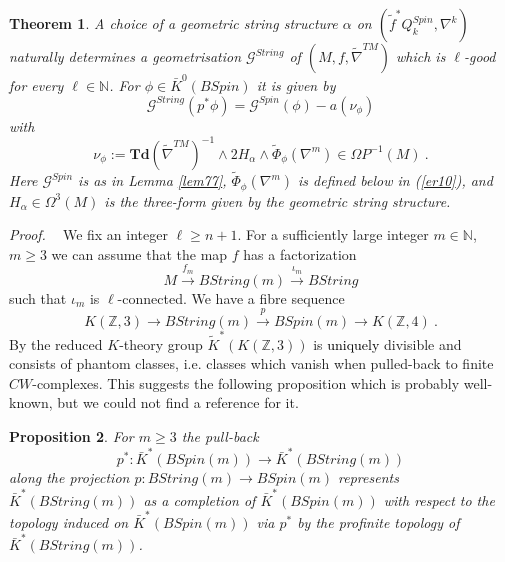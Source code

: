 \documentclass[12pt]{article}
\newtheorem{theorem}{Theorem}[section]
\newtheorem{prop}[theorem]{Proposition}
\newcommand{\cG}{{\mathcal{G}}}
\newcommand{\proof}{{\it Proof.$\:\:\:\:$}}
\newcommand{\nat}{{\mathbb{N}}}
\newcommand{\Z}{{\mathbb{Z}}}
\newcommand{\Td}{{\mathbf{Td}}}
\begin{document}
\begin{theorem}\label{prop77}
A choice of a geometric string structure
 $\alpha$ on $(\tilde f^{*}Q^{Spin}_{k},\nabla^{k})$ naturally determines 
a geometrisation   $\cG^{String}$ of $(M,f,\tilde \nabla^{TM})$ which is $\ell$-good for every $\ell\in \nat$.
For $\phi\in \bar K^{0}(BSpin)$ it is given by
$$\cG^{String}(p^{*}\phi)=\cG^{Spin}(\phi)-a(\nu_{\phi})$$
with
$$\nu_{\phi}:=
\Td(\tilde \nabla^{TM})^{-1}\wedge 2H_{\alpha}\wedge \tilde \Phi_{\phi}(\nabla^{m})\in \Omega P^{-1}(M)\ .$$ Here 
$\cG^{Spin}$ is as in Lemma \ref{lem77}, 
 $\tilde \Phi_{\phi}(\nabla^{m})$ is defined below in (\ref{er10}),
and $H_{\alpha}\in \Omega^{3}(M)$ is the three-form given by the geometric string structure. 
 \end{theorem}
 \proof
\color{black} 
We fix an integer $\ell\ge n+1$.
For a sufficiently large   integer $m\in \nat$, $m\ge 3$ we can assume that
 the map $f$ has a factorization $$M\stackrel{f_{m}}{\to} BString(m) \stackrel{\iota_{m}}{\to} BString$$
 such that $\iota_{m}$ is $\ell$-connected.
 We have a fibre sequence
$$K(\Z,3)\to BString(m)\stackrel{p}{\to} BSpin(m)\to K(\Z,4)\ .$$
By \cite{MR0231369} the reduced $K$-theory group
$\tilde K^{*}(K(\Z,3))$   is \textcolor{black}{uniquely} divisible and consists of phantom classes, i.e. classes which vanish when pulled-back to finite $CW$-complexes. This suggests the following proposition which is probably well-known, but we could not find a reference for it.




 
 \begin{prop}\label{pinv}
 For $m\ge 3$
the pull-back  \begin{equation}\label{barp}p^{*}:\bar K^{*}(BSpin(m)) \to   \bar K^{*}(BString(m)) \end{equation} along the projection 
$p:BString(m)\to BSpin(m)$ represents $\bar K^{*}(BString(m))$ as a completion of $\bar K^{*}(BSpin(m))$
with respect to the topology induced on $\bar K^{*}(BSpin(m))$ via $p^{*}$ by the profinite topology of $\bar K^{*}(BString(m))$.
\end{prop}
\end{document}
